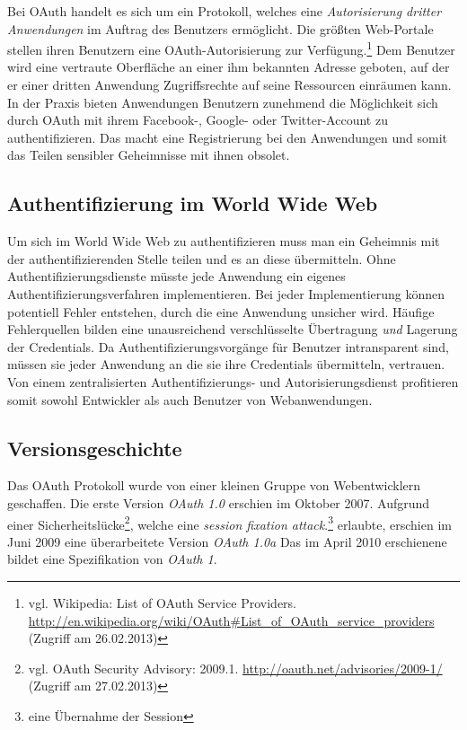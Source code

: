 \documentclass[12pt,a4paper,pointednumbers,abstracton]{scrartcl}
\begin{document}
Bei OAuth handelt es sich um ein Protokoll, welches eine \emph{Autorisierung dritter Anwendungen} im Auftrag des Benutzers ermöglicht.
Die größten Web-Portale stellen ihren Benutzern eine OAuth-Autorisierung zur Verfügung.\footnote{vgl. Wikipedia: List of OAuth Service Providers. \url{http://en.wikipedia.org/wiki/OAuth\#List_of_OAuth_service_providers} (Zugriff am 26.02.2013)}
Dem Benutzer wird eine vertraute Oberfläche an einer ihm bekannten Adresse geboten, auf der er einer dritten Anwendung Zugriffsrechte auf seine Ressourcen einräumen kann.
In der Praxis bieten Anwendungen Benutzern zunehmend die Möglichkeit sich durch OAuth mit ihrem Facebook-, Google- oder Twitter-Account zu authentifizieren.
Das macht eine Registrierung bei den Anwendungen und somit das Teilen sensibler Geheimnisse mit ihnen obsolet.

\subsection{Authentifizierung im World Wide Web}

Um sich im World Wide Web zu authentifizieren muss man ein Geheimnis mit der authentifizierenden Stelle teilen und es an diese übermitteln.
Ohne Authentifizierungsdienste müsste jede Anwendung ein eigenes Authentifizierungsverfahren implementieren.
Bei jeder Implementierung können potentiell Fehler entstehen, durch die eine Anwendung unsicher wird.
Häufige Fehlerquellen bilden eine unausreichend verschlüsselte Übertragung \emph{und} Lagerung der Credentials.
Da Authentifizierungsvorgänge für Benutzer intransparent sind, müssen sie jeder Anwendung an die sie ihre Credentials übermitteln, vertrauen.
Von einem zentralisierten Authentifizierungs- und Autorisierungsdienst profitieren somit sowohl Entwickler als auch Benutzer von Webanwendungen.

\subsection{Versionsgeschichte}

Das OAuth Protokoll wurde von einer kleinen Gruppe von Webentwicklern geschaffen.
Die erste Version \emph{OAuth 1.0} erschien im Oktober 2007.
Aufgrund einer Sicherheitslücke\footnote{vgl. OAuth Security Advisory: 2009.1. \url{http://oauth.net/advisories/2009-1/} (Zugriff am 27.02.2013)}, welche eine \emph{session fixation attack}.\footnote{eine Übernahme der Session} erlaubte, erschien im Juni 2009 eine überarbeitete Version \emph{OAuth 1.0a}
Das im April 2010 erschienene \cite{RFC5849} bildet eine Spezifikation von \emph{OAuth 1}.
\end{document}
